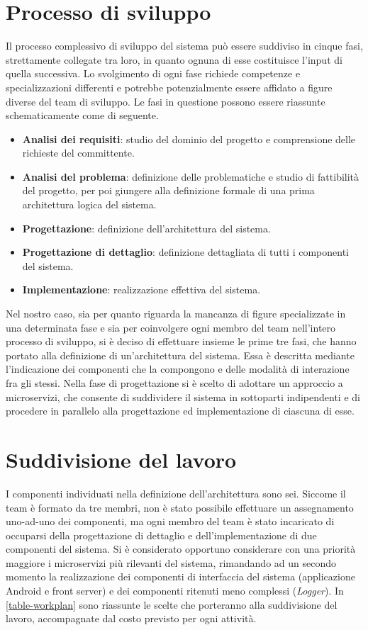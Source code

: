 \documentclass[a4paper,12pt]{report}
\begin{document}
\section{Processo di sviluppo}
Il processo complessivo di sviluppo del sistema può essere suddiviso in cinque fasi, strettamente collegate tra loro, in quanto ognuna di esse costituisce l'input di quella successiva. Lo svolgimento di ogni fase richiede competenze e specializzazioni differenti e potrebbe potenzialmente essere affidato a figure diverse del team di sviluppo. Le fasi in questione possono essere riassunte schematicamente come di seguente.
\begin{itemize}
	\item \textbf{Analisi dei requisiti}: studio del dominio del progetto e comprensione delle richieste del committente.
	\item \textbf{Analisi del problema}: definizione delle problematiche e studio di fattibilità del progetto, per poi giungere alla definizione formale di una prima architettura logica del sistema. 
	\item \textbf{Progettazione}: definizione dell'architettura del sistema.
	\item \textbf{Progettazione di dettaglio}: definizione dettagliata di tutti i componenti del sistema.
	\item \textbf{Implementazione}: realizzazione effettiva del sistema.
\end{itemize}

Nel nostro caso, sia per quanto riguarda la mancanza di figure specializzate in una determinata fase e sia per coinvolgere ogni membro del team nell'intero processo di sviluppo, si è deciso di effettuare insieme le prime tre fasi, che hanno portato alla definizione di un'architettura del sistema. Essa è descritta mediante l'indicazione dei componenti che la compongono e delle modalità di interazione fra gli stessi. Nella fase di progettazione si è scelto di adottare un approccio a microservizi, che consente di suddividere il sistema in sottoparti indipendenti e di procedere in parallelo alla progettazione ed implementazione di ciascuna di esse.

\section{Suddivisione del lavoro}
I componenti individuati nella definizione dell'architettura sono sei. Siccome il team è formato da tre membri, non è stato possibile effettuare un assegnamento uno-ad-uno dei componenti, ma ogni membro del team è stato incaricato di occuparsi della progettazione di dettaglio e dell'implementazione di due componenti del sistema. Si è considerato opportuno considerare con una priorità maggiore i microservizi più rilevanti del sistema, rimandando ad un secondo momento la realizzazione dei componenti di interfaccia del sistema (applicazione Android e front server) e dei componenti ritenuti meno complessi (\emph{Logger}). In \autoref{table-workplan} sono riassunte le scelte che porteranno alla suddivisione del lavoro, accompagnate dal costo previsto per ogni attività.
\end{document}
